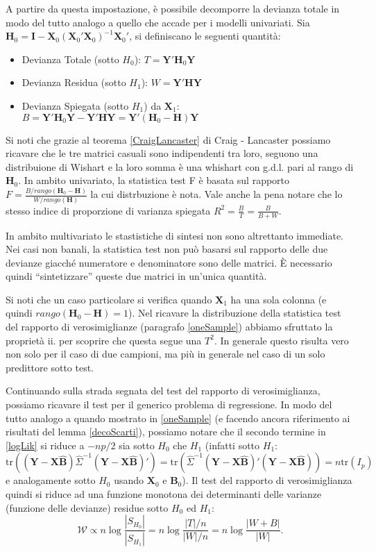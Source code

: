 \documentclass[10pt]{article}
\newcommand{\bfB}{\mathbf{B}}
\newcommand{\HH}{\mathbf{H}}
\newcommand{\tr}{\mathrm{tr}}
\newcommand{\XX}{\mathbf{X}}
\newcommand{\YY}{\mathbf{Y}}
\newcommand{\I}{\mathbf{I}}
\begin{document}
A partire da questa impostazione, è possibile decomporre la devianza totale in modo del tutto analogo a quello che accade per i modelli univariati.
Sia $\HH_0=\I -  \XX_0(\XX_0'\XX_0)^{-1}\XX_0'$, si definiscano le seguenti quantità:
\begin{itemize}
\item Devianza Totale (sotto $H_0$): $T=\YY'\HH_0\YY$
\item Devianza Residua (sotto $H_1$):  $W=\YY'\HH\YY$
\item Devianza Spiegata (sotto $H_1$) da $\XX_1$: $B=\YY'\HH_0\YY-\YY'\HH\YY=\YY'(\HH_0-\HH)\YY$
\end{itemize}

Si noti che grazie al teorema \ref{CraigLancaster} di Craig - Lancaster possiamo ricavare che le tre matrici casuali sono indipendenti tra loro, seguono una distribuione di Wishart e la loro somma è una whishart con g.d.l. pari al rango di $\HH_0$.
In ambito univariato, la statistica test F è basata sul rapporto $F=\frac{B/rango(\HH_0-\HH)}{W/rango(\HH)}$ la cui distrbuzione è nota. Vale anche la pena notare che lo stesso indice di proporzione di varianza spiegata $R^2=\frac{B}{T}=\frac{B}{B+W}$.

In ambito multivariato le stastistiche di sintesi non sono altrettanto immediate. Nei casi non banali, la statistica test non può basarsi sul rapporto delle due devianze giacch\'e numeratore e denominatore sono delle matrici. 
\`E necessario quindi ``sintetizzare'' queste due matrici in un'unica quantità.

Si noti che un caso particolare si verifica quando $\XX_1$ ha una sola colonna (e quindi $rango(\HH_0-\HH)=1$). Nel ricavare la distribuzione della statistica test del rapporto di verosimiglianze (paragrafo \ref{oneSample}) abbiamo sfruttato la proprietà ii. per scoprire che questa segue una $T^2$. In generale questo risulta vero non solo per il caso di due campioni, ma più in generale nel caso di un solo predittore sotto test.

Continuando sulla strada segnata del test del rapporto di verosimiglianza, possiamo ricavare il test per il generico problema di regressione.
In modo del tutto analogo a quando mostrato in \ref{oneSample} (e facendo ancora riferimento ai risultati del lemma \ref{decoScarti}), possiamo notare che
il secondo termine in \ref{logLik} si riduce a $-np/2$ sia sotto $H_0$ che $H_1$ (infatti sotto $H_1$: $\tr\left( (\YY-\XX\hat{\bfB})\hat{\Sigma}^{-1}(\YY-\XX\hat{\bfB})' \right)=
\tr\left( \hat{\Sigma}^{-1}(\YY-\XX\hat{\bfB})'(\YY-\XX\hat{\bfB}) \right)=n\tr(I_p)$ e analogamente sotto $H_0$ usando $\XX_0$ e $\bfB_0$).
Il test del rapporto di verosimiglianza quindi si riduce ad una funzione monotona dei determinanti delle varianze (funzione delle devianze) residue sotto $H_0$ ed $H_1$:
$$\mathcal{W}\propto n\log\frac{|S_{H_0}|}{|S_{H_1}|}=n\log\frac{|T|/n}{|W|/n}=n\log\frac{|W+B|}{|W|}.$$
\end{document}
